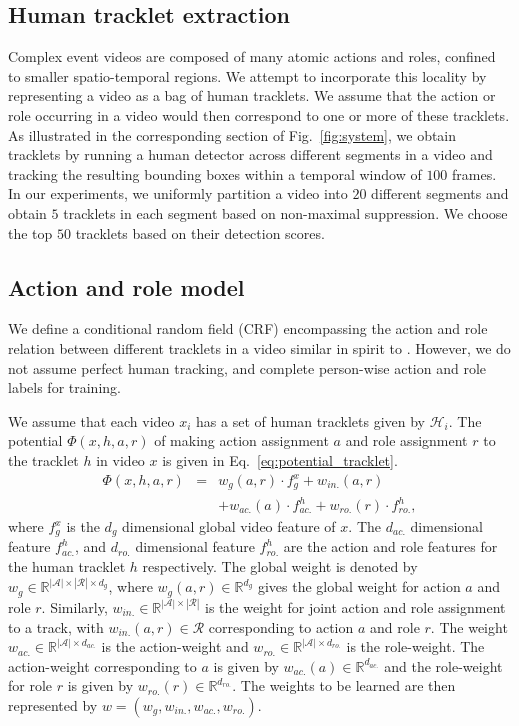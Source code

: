 \documentclass[10pt,twocolumn,letterpaper]{article}
\begin{document}
\subsection{Human tracklet extraction}
Complex event videos are composed of many atomic actions and roles, 
confined to smaller spatio-temporal regions. 
We attempt to incorporate this locality by representing a video as a bag of human tracklets. 
We assume that the action or role occurring in a video would then correspond to one or more of these tracklets. 
As illustrated in the corresponding section of Fig.~\ref{fig:system}, 
we obtain tracklets by running a human detector \cite{Felzenszwalb_PAMI10} across different segments in a video 
and tracking the resulting bounding boxes within a temporal window of $100$ frames. 
In our experiments, we uniformly partition a video into $20$ different segments and obtain $5$ tracklets in each segment 
based on non-maximal suppression. We choose the top $50$ tracklets based on their detection scores.

\subsection{Action and role model}\label{sec:model_features}
We define a conditional random field (CRF) encompassing the action and role relation between different tracklets
in a video similar in spirit to \cite{Lan_CVPR12}. 
However, we do not assume perfect human tracking, 
and complete person-wise action and role labels for training. 

We assume that each video $x_i$ has a set of human tracklets given by $\mathcal{H}_i$. 
The potential $\Phi(x, h, a, r)$ of making
action assignment $a$ and role assignment $r$ to the tracklet $h$ in video $x$ is given in Eq.~\ref{eq:potential_tracklet}.
\vspace{-4pt}
\begin{eqnarray}\label{eq:potential_tracklet}
  \Phi(x, h, a, r) & = & w_{g}(a,r) \cdot f_{g}^x + w_{in.}(a,r) \\ \nonumber
                   & & + w_{ac.}(a) \cdot f_{ac.}^h + w_{ro.}(r) \cdot f_{ro.}^h, \nonumber
\end{eqnarray} where $f_g^x$ is the $d_g$ dimensional global video feature of $x$. The $d_{ac.}$ dimensional feature
$f_{ac.}^h$, and $d_{ro.}$ dimensional feature $f_{ro.}^h$ are the action and role features 
for the human tracklet $h$ respectively. The global weight is denoted 
by $w_g \in \mathbb{R}^{|\mathcal{A}| \times |\mathcal{R}| \times d_g}$, where $w_g(a,r) \in \mathbb{R}^{d_g}$
gives the global weight for action $a$ and role $r$.
Similarly, $w_{in.} \in \mathbb{R}^{|\mathcal{A}| \times |\mathcal{R}|}$ is the weight for joint 
action and role assignment to a track, with $w_{in.}(a,r) \in \mathcal{R}$ corresponding to action $a$ and role $r$. 
The weight $w_{ac.} \in \mathbb{R}^{|\mathcal{A}| \times d_{ac.}}$
is the action-weight and $w_{ro.} \in \mathbb{R}^{|\mathcal{A}| \times d_{ro.}}$ is the role-weight. The action-weight corresponding
to $a$ is given by $w_{ac.}(a) \in \mathbb{R}^{d_{ac.}}$ and the role-weight for role $r$ is given by $w_{ro.}(r) \in \mathbb{R}^{d_{ro.}}$.
The weights to be learned are then represented by $w = (w_g, w_{in.}, w_{ac.}, w_{ro.})$.
\end{document}
